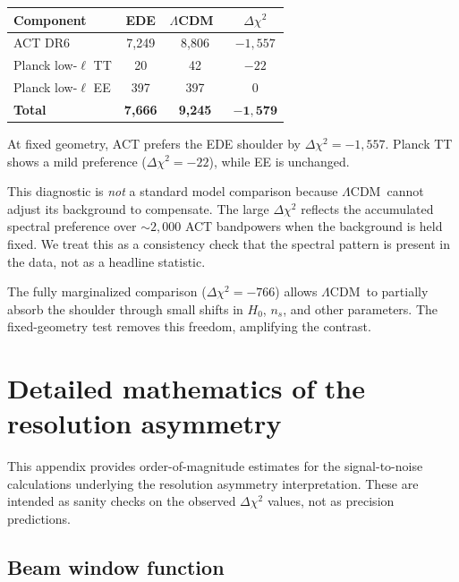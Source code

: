 \documentclass[twocolumn,showpacs,preprintnumbers,amsmath,amssymb,prd]{revtex4-2}
\newcommand{\lcdm}{$\Lambda$CDM}
\begin{document}
\begin{center}
\begin{tabular}{lccc}
\toprule
Component & EDE & \lcdm\ & $\Delta\chi^2$ \\
\midrule
ACT DR6 & 7{,}249 & 8{,}806 & $-1{,}557$ \\
Planck low-$\ell$ TT & 20 & 42 & $-22$ \\
Planck low-$\ell$ EE & 397 & 397 & $0$ \\
\midrule
\textbf{Total} & \textbf{7{,}666} & \textbf{9{,}245} & $\mathbf{-1{,}579}$ \\
\bottomrule
\end{tabular}
\end{center}

At fixed geometry, ACT prefers the EDE shoulder by $\Delta\chi^2 = -1{,}557$. 
Planck TT shows a mild preference ($\Delta\chi^2 = -22$), while EE is unchanged.

This diagnostic is \emph{not} a standard model comparison because \lcdm\ cannot 
adjust its background to compensate. The large $\Delta\chi^2$ reflects the 
accumulated spectral preference over $\sim 2{,}000$ ACT bandpowers when the 
background is held fixed. We treat this as a consistency check that the 
spectral pattern is present in the data, not as a headline statistic.

The fully marginalized comparison ($\Delta\chi^2 = -766$) allows \lcdm\ to 
partially absorb the shoulder through small shifts in $H_0$, $n_s$, and other 
parameters. The fixed-geometry test removes this freedom, amplifying the contrast.

\section{Detailed mathematics of the resolution asymmetry}
\label{app:math}

This appendix provides order-of-magnitude estimates for the signal-to-noise 
calculations underlying the resolution asymmetry interpretation. These are 
intended as sanity checks on the observed $\Delta\chi^2$ values, not as 
precision predictions.

\subsection{Beam window function}
\end{document}
